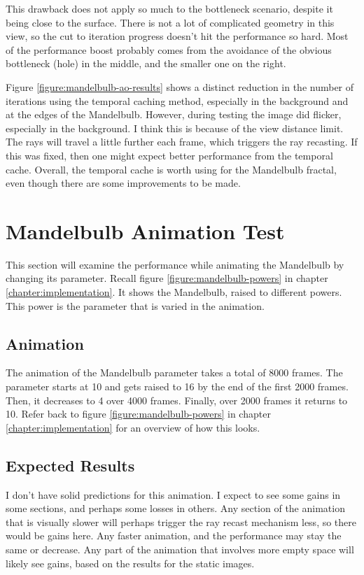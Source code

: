 This drawback does not apply so much to the bottleneck scenario, despite it being close to the surface. There is not a lot of complicated geometry in this view, so the cut to iteration progress doesn't hit the performance so hard. Most of the performance boost probably comes from the avoidance of the obvious bottleneck (hole) in the middle, and the smaller one on the right.\newline

Figure \ref{figure:mandelbulb-ao-results} shows a distinct reduction in the number of iterations using the temporal caching method, especially in the background and at the edges of the Mandelbulb. However, during testing the image did flicker, especially in the background. I think this is because of the view distance limit. The rays will travel a little further each frame, which triggers the ray recasting. If this was fixed, then one might expect better performance from the temporal cache. Overall, the temporal cache is worth using for the Mandelbulb fractal, even though there are some improvements to be made.

\section{Mandelbulb Animation Test}

This section will examine the performance while animating the Mandelbulb by changing its parameter. Recall figure \ref{figure:mandelbulb-powers} in chapter \ref{chapter:implementation}. It shows the Mandelbulb, raised to different powers. This power is the parameter that is varied in the animation.

\subsection{Animation}

The animation of the Mandelbulb parameter takes a total of 8000 frames. The parameter starts at 10 and gets raised to 16 by the end of the first 2000 frames. Then, it decreases to 4 over 4000 frames. Finally, over 2000 frames it returns to 10. Refer back to figure \ref{figure:mandelbulb-powers} in chapter \ref{chapter:implementation} for an overview of how this looks.

\subsection{Expected Results}

I don't have solid predictions for this animation. I expect to see some gains in some sections, and perhaps some losses in others. Any section of the animation that is visually slower will perhaps trigger the ray recast mechanism less, so there would be gains here. Any faster animation, and the performance may stay the same or decrease. Any part of the animation that involves more empty space will likely see gains, based on the results for the static images.

